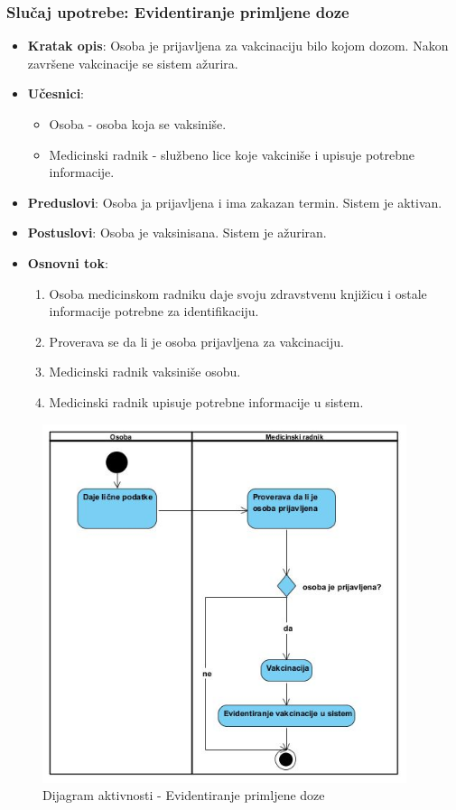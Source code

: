 \documentclass[titlepage]{article}
\begin{document}
\subsubsection{Slučaj upotrebe: Evidentiranje primljene doze}
\begin{itemize}
	\item \textbf{Kratak opis}: Osoba je prijavljena za vakcinaciju bilo kojom dozom. Nakon završene vakcinacije se sistem ažurira.
	\item \textbf{Učesnici}:
	\begin{itemize}
		\item Osoba - osoba koja se vaksiniše.
		\item Medicinski radnik - službeno lice koje vakciniše i upisuje potrebne informacije.
	\end{itemize}
	\item \textbf{Preduslovi}: Osoba ja prijavljena i ima zakazan termin. Sistem je aktivan.
	\item \textbf{Postuslovi}: Osoba je vaksinisana. Sistem je ažuriran.
	\item \textbf{Osnovni tok}:
	\begin{enumerate}
		\item Osoba medicinskom radniku daje svoju zdravstvenu knjižicu i ostale informacije potrebne za identifikaciju.
		\item Proverava se da li je osoba prijavljena za vakcinaciju.
		\item Medicinski radnik vaksiniše osobu.
		\item Medicinski radnik upisuje potrebne informacije u sistem.
	\end{enumerate}
\end{itemize}

\begin{center}
	\begin{figure}[H]
		\includegraphics[width=0.95\textwidth]{Vakcinacija}
		\caption{Dijagram aktivnosti - Evidentiranje primljene doze}
	\end{figure}
\end{center}
\end{document}
